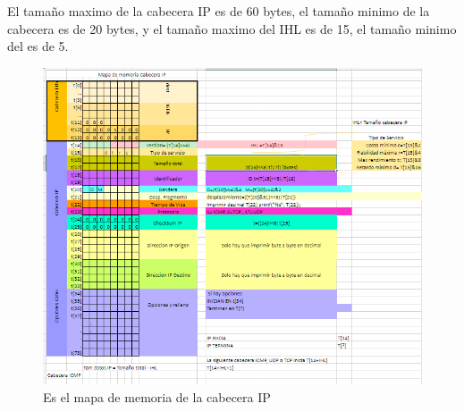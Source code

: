 \vskip 1pt
El tama\~no maximo de la cabecera IP es de 60 bytes, el tama\~no minimo de la cabecera es de 20 bytes, y el tama\~no maximo del IHL es de 15, el tama\~no minimo del es de 5.
		\begin{figure}[h]
			\centering		
			\includegraphics[width=\textwidth]{MapaMemoria}
			\caption{Es el mapa de memoria de la cabecera IP}
		\end{figure}
\clearpage
